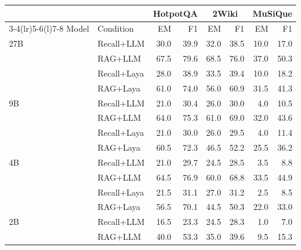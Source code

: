 \begin{tabular}{@{}l@{\hspace{4pt}}l@{\hspace{4pt}}r@{\hspace{4pt}}r@{\hspace{4pt}}r@{\hspace{4pt}}r@{\hspace{4pt}}r@{\hspace{4pt}}r@{}}
\toprule
 & & \multicolumn{2}{c}{HotpotQA} & \multicolumn{2}{c}{2Wiki} & \multicolumn{2}{c}{MuSiQue} \\
\cmidrule(lr){3-4}\cmidrule(lr){5-6}\cmidrule(l){7-8}
Model & Condition & EM & F1 & EM & F1 & EM & F1 \\
\midrule
27B & Recall+LLM & 30.0 & 39.9 & 32.0 & 38.5 & 10.0 & 17.0 \\ %
 & RAG+LLM & 67.5 & 79.6 & 68.5 & 76.0 & 37.0 & 50.3 \\ %
 & Recall+Laya & 28.0 & 38.9 & 33.5 & 39.4 & 10.0 & 18.2 \\ %
 & RAG+Laya & 61.0 & 74.0 & 56.0 & 60.9 & 31.5 & 41.3 \\ %
\midrule
9B & Recall+LLM & 21.0 & 30.4 & 26.0 & 30.0 & 4.0 & 10.5 \\ %
 & RAG+LLM & 64.0 & 75.3 & 61.0 & 69.0 & 32.0 & 43.6 \\ %
 & Recall+Laya & 21.0 & 30.0 & 26.0 & 29.5 & 4.0 & 11.4 \\ %
 & RAG+Laya & 60.5 & 72.3 & 46.5 & 52.2 & 25.5 & 36.2 \\ %
\midrule
4B & Recall+LLM & 21.0 & 29.7 & 24.5 & 28.5 & 3.5 & 8.8 \\ %
 & RAG+LLM & 64.5 & 76.9 & 60.0 & 68.8 & 33.5 & 44.9 \\ %
 & Recall+Laya & 21.5 & 31.1 & 27.0 & 31.2 & 2.5 & 8.5 \\ %
 & RAG+Laya & 56.5 & 70.1 & 44.5 & 50.3 & 22.0 & 33.0 \\ %
\midrule
2B & Recall+LLM & 16.5 & 23.3 & 24.5 & 28.3 & 1.0 & 7.0 \\ %
 & RAG+LLM & 40.0 & 53.3 & 35.0 & 39.6 & 9.5 & 15.3 \\ %

\end{tabular}
